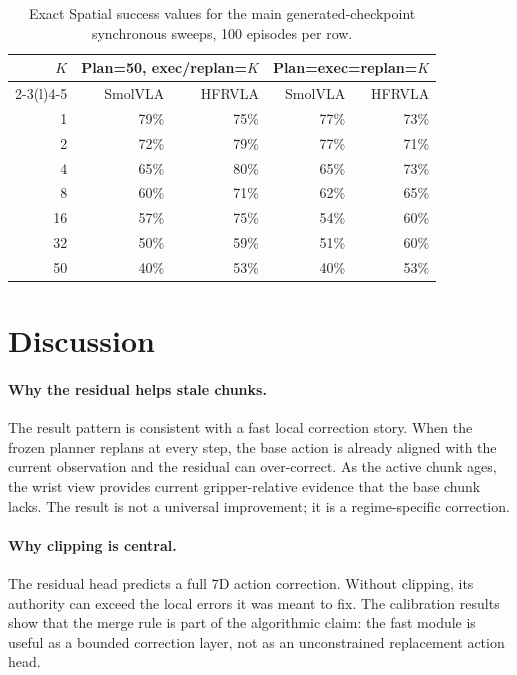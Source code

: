 \documentclass[10pt]{article}
\newcommand{\method}{HFRVLA}
\newcommand{\smolvla}{SmolVLA}
\begin{document}
\begin{table}[t]
  \centering
  \caption{Exact Spatial success values for the main generated-checkpoint synchronous sweeps, 100 episodes per row.}
  \begin{tabular}{@{}rrrrr@{}}
    \toprule
    $K$ & \multicolumn{2}{c}{Plan=50, exec/replan=$K$} & \multicolumn{2}{c}{Plan=exec=replan=$K$} \\
    \cmidrule(lr){2-3}\cmidrule(l){4-5}
    & \smolvla{} & \method{} & \smolvla{} & \method{} \\
    \midrule
    1  & 79\% & 75\% & 77\% & 73\% \\
    2  & 72\% & 79\% & 77\% & 71\% \\
    4  & 65\% & 80\% & 65\% & 73\% \\
    8  & 60\% & 71\% & 62\% & 65\% \\
    16 & 57\% & 75\% & 54\% & 60\% \\
    32 & 50\% & 59\% & 51\% & 60\% \\
    50 & 40\% & 53\% & 40\% & 53\% \\
    \bottomrule
  \end{tabular}
  \label{tab:exact-values}
\end{table}

\section{Discussion}

\paragraph{Why the residual helps stale chunks.}
The result pattern is consistent with a fast local correction story. When the frozen planner replans at every step, the base action is already aligned with the current observation and the residual can over-correct. As the active chunk ages, the wrist view provides current gripper-relative evidence that the base chunk lacks. The result is not a universal improvement; it is a regime-specific correction.

\paragraph{Why clipping is central.}
The residual head predicts a full 7D action correction. Without clipping, its authority can exceed the local errors it was meant to fix. The calibration results show that the merge rule is part of the algorithmic claim: the fast module is useful as a bounded correction layer, not as an unconstrained replacement action head.
\end{document}
